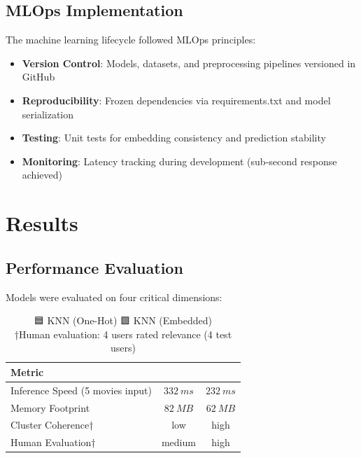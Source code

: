 \documentclass{article}
\begin{document}
\subsection*{MLOps Implementation}
The machine learning lifecycle followed MLOps principles:
\begin{itemize}
    \item \textbf{Version Control}: Models, datasets, and preprocessing pipelines versioned in GitHub
    \item \textbf{Reproducibility}: Frozen dependencies via requirements.txt and model serialization
    \item \textbf{Testing}: Unit tests for embedding consistency and prediction stability
    \item \textbf{Monitoring}: Latency tracking during development (sub-second response achieved)
\end{itemize}




\section*{Results}

\subsection*{Performance Evaluation}
    Models were evaluated on four critical dimensions:
    \begin{table}[H]
    \centering
        \begin{tabular}{|l|c|c|}
            \hline
            \textbf{Metric}      & \raisebox{-0.3ex}{\emojifont 🟦} &   \raisebox{-0.3ex}{\emojifont 🟩}  \\
            \hline
            \hline
            Inference Speed (5 movies input) & $332  \ ms$              & $ 232 \ ms$              \\
            \hline
            Memory Footprint     & $ 82 \ MB$          & $ 62 \ MB$           \\
            \hline
            Cluster Coherence†   & low              & high               \\
            \hline
            Human Evaluation†    & medium           & high               \\
            \hline
            \hline
        \end{tabular}
        \caption{\footnotesize{ 
            {\emojifont 🟦}  KNN (One-Hot) 
            {\emojifont 🟩}  KNN (Embedded)  \\
            †Human evaluation: 4 users rated relevance (4 test users)} 
        }
    \end{table}
    
\end{document}
